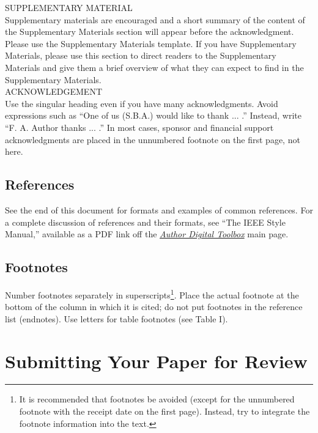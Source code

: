 \documentclass[journal]{IEEEtran}
\begin{document}
SUPPLEMENTARY MATERIAL\\
Supplementary materials are encouraged and a short summary of the content of the Supplementary Materials section will appear before the acknowledgment. Please use the Supplementary Materials template. If you have Supplementary Materials, please use this section to direct readers to the Supplementary Materials and give them a brief overview of what they can expect to find in the Supplementary Materials. \\


ACKNOWLEDGEMENT\\
Use the singular heading even if you have many acknowledgments. Avoid expressions such as “One of us (S.B.A.) would like to thank ... .” Instead, write “F. A. Author thanks ... .” In most cases, sponsor and financial support acknowledgments are placed in the unnumbered footnote on the first page, not here.


\subsection{References}

See the end of this document for formats and examples of common references. For a complete discussion of references and their formats, see “The IEEE Style Manual,” available as a PDF link off the  \underline{\textit{Author Digital Toolbox}} main page.

\subsection{Footnotes}
Number footnotes separately in superscripts\footnote{It is recommended that footnotes be avoided (except for the unnumbered footnote with the receipt date on the first page). Instead, try to integrate the footnote information into the text.}.  Place the actual footnote at the bottom of the column in which it is cited; do not put footnotes in the reference list (endnotes). Use letters for table footnotes (see Table I). 


\section{Submitting Your Paper for Review}
\end{document}
